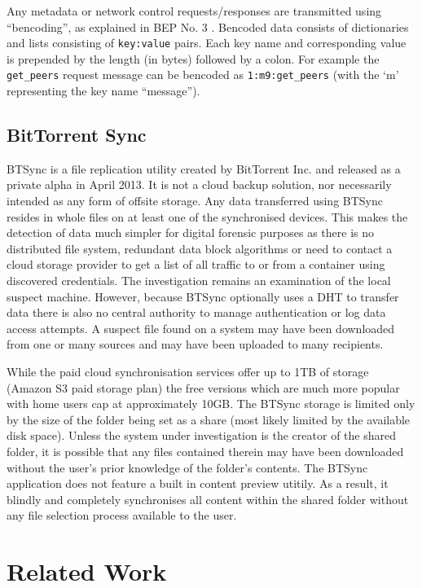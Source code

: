 \documentclass[final,5p,times,twocolumn]{elsarticle}
\begin{document}
Any metadata or network control requests/responses are transmitted using ``bencoding'', as explained in BEP No. 3 \cite{cohen2008bittorrent}. Bencoded data consists of dictionaries and lists consisting of \texttt{key:value} pairs. Each key name and corresponding value is prepended by the length (in bytes) followed by a colon. For example the \texttt{get\_peers} request message can be bencoded as \texttt{1:m9:get\_peers} (with the `m' representing the key name ``message'').

\subsection{BitTorrent Sync}
\label{btsync}

BTSync is a file replication utility created by BitTorrent Inc. and released as a private alpha in April 2013\cite{bitsync}. It is not a cloud backup solution, nor necessarily intended as any form of offsite storage. Any data transferred using BTSync resides in whole files on at least one of the synchronised devices. This makes the detection of data much simpler for digital forensic purposes as there is no distributed file system, redundant data block algorithms or need to contact a cloud storage provider to get a list of all traffic to or from a container using discovered credentials. The investigation remains an examination of the local suspect machine. However, because BTSync optionally uses a DHT to transfer data there is also no central authority to manage authentication or log data access attempts. A suspect file found on a system may have been downloaded from one or many sources and may have been uploaded to many recipients. 

While the paid cloud synchronisation services offer up to 1TB of storage (Amazon S3 paid storage plan) the free versions which are much more popular with home users cap at approximately 10GB. The BTSync storage is limited only by the size of the folder being set as a share (most likely limited by the available disk space). Unless the system under investigation is the creator of the shared folder, it is possible that any files contained therein may have been downloaded without the user's prior knowledge of the folder's contents. The BTSync application does not feature a built in content preview utitily. As a result, it blindly and completely synchronises all content within the shared folder without any file selection process available to the user. 




\section{Related Work}
\label{related}
\end{document}
